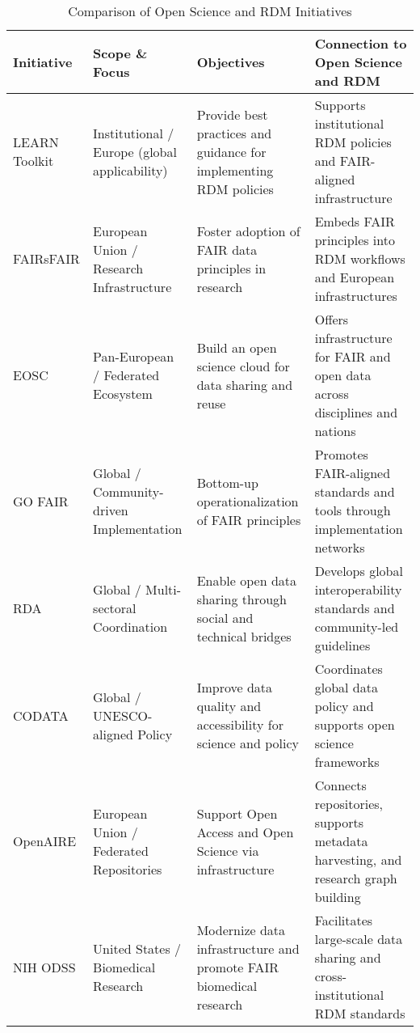 \begin{table}[H]
    \centering
    \caption{Comparison of Open Science and RDM Initiatives}
    \label{tab:initiative_comparison}
    \begin{tabularx}{\textwidth}{|X|X|X|X|}
        \hline
        \textbf{Initiative} & \textbf{Scope \& Focus}                          & \textbf{Objectives}                                                  & \textbf{Connection to Open Science and RDM}                                      \\
        \hline
        LEARN Toolkit       & Institutional / Europe (global applicability)    & Provide best practices and guidance for implementing RDM policies    & Supports institutional RDM policies and FAIR-aligned infrastructure              \\
        \hline
        FAIRsFAIR           & European Union / Research Infrastructure         & Foster adoption of FAIR data principles in research                  & Embeds FAIR principles into RDM workflows and European infrastructures           \\
        \hline
        EOSC                & Pan-European / Federated Ecosystem               & Build an open science cloud for data sharing and reuse               & Offers infrastructure for FAIR and open data across disciplines and nations      \\
        \hline
        GO FAIR             & Global / Community-driven Implementation         & Bottom-up operationalization of FAIR principles                      & Promotes FAIR-aligned standards and tools through implementation networks        \\
        \hline
        RDA                 & Global / Multi-sectoral Coordination             & Enable open data sharing through social and technical bridges        & Develops global interoperability standards and community-led guidelines          \\
        \hline
        CODATA              & Global / UNESCO-aligned Policy                   & Improve data quality and accessibility for science and policy        & Coordinates global data policy and supports open science frameworks              \\
        \hline
        OpenAIRE            & European Union / Federated Repositories          & Support Open Access and Open Science via infrastructure              & Connects repositories, supports metadata harvesting, and research graph building \\
        \hline
        NIH ODSS            & United States / Biomedical Research              & Modernize data infrastructure and promote FAIR biomedical research   & Facilitates large-scale data sharing and cross-institutional RDM standards       \\

\end{tabularx}
\end{table}

